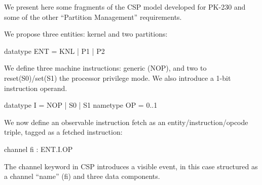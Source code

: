 We present here some fragments of the CSP model developed for PK-230
and some of the other ``Partition Management'' requirements.

We propose three entities: kernel and two partitions:
\begin{cspm}
datatype ENT = KNL | P1 | P2
\end{cspm}
We define three machine instructions: generic (NOP),
and two to reset(S0)/set(S1)
the processor privilege mode.
We also introduce a 1-bit instruction operand.
\begin{cspm}
datatype I = NOP | S0 | S1
nametype OP = {0..1}
\end{cspm}
We now define an observable instruction fetch as an entity/instruction/opcode
triple, tagged as a fetched instruction:
\begin{cspm}
channel fi : ENT.I.OP
\end{cspm}
The channel keyword in CSP introduces a visible event,
in this case structured as a channel ``name'' (fi)
and three data components.

